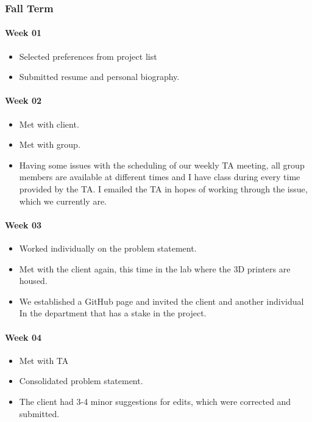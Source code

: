 \subsubsection{Fall Term}
\paragraph{Week 01}
\begin{itemize}
\item Selected preferences from project list
\item Submitted resume and personal biography.
\end{itemize}
\paragraph{Week 02}
\begin{itemize}
\item Met with client.
\item Met with group.
\item Having some issues with the scheduling of our weekly TA meeting, all group members are available at different times and I have class during every time provided by the TA. I emailed the TA in hopes of working through the issue, which we currently are. 
\end{itemize}
\paragraph{Week 03}
\begin{itemize}
\item Worked individually on the problem statement.
\item Met with the client again, this time in the lab where the 3D printers are housed. 
\item We established a GitHub page and invited the client and another individual 
In the department that has a stake in the project.
\end{itemize}
\paragraph{Week 04}
\begin{itemize}
\item Met with TA
\item Consolidated problem statement.
\item The client had 3-4 minor suggestions for edits, which were corrected and submitted.
\end{itemize}
